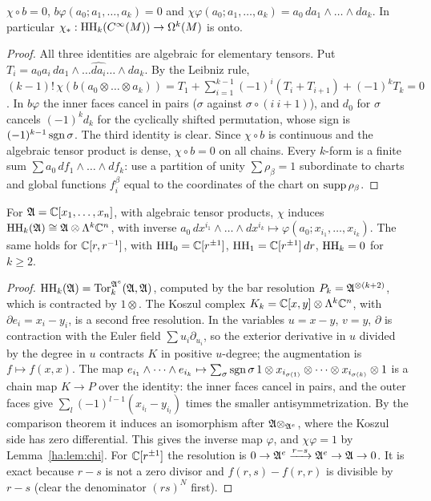 \begin{lemma}\label{ha:lem:chi}
\(\chi\circ b=0\), \(b\varphi(a_0;a_1,\dots,a_k)=0\) and
\(\chi\varphi(a_0;a_1,\dots,a_k)=a_0\,da_1\wedge\dots\wedge da_k\). In
particular \(\chi_*:\operatorname{HH}_k(C^\infty(M))\to\Omega^k(M)\) is onto.
\end{lemma}

\begin{proof}
All three identities are algebraic for elementary tensors. Put
\(T_i=a_0a_i\,da_1\wedge\dots\widehat{da_i}\dots\wedge da_k\). By the Leibniz
rule, \((k-1)!\,\chi(b(a_0\otimes\dots\otimes a_k))=T_1+\sum_{i=1}^{k-1}
(-1)^i(T_i+T_{i+1})+(-1)^kT_k=0\). In \(b\varphi\) the inner faces cancel in
pairs (\(\sigma\) against \(\sigma\circ(i\ i{+}1)\)), and \(d_0\) for
\(\sigma\) cancels \((-1)^kd_k\) for the cyclically shifted permutation,
whose sign is \((-1)^{k-1}\operatorname{sgn}\sigma\). The third identity is clear. Since
\(\chi\circ b\) is continuous and the algebraic tensor product is dense,
\(\chi\circ b=0\) on all chains. Every \(k\)-form is a finite sum
\(\sum a_0\,df_1\wedge\dots\wedge df_k\): use a partition of unity
\(\sum\rho_\beta=1\) subordinate to charts and global functions
\(f^\beta_i\) equal to the coordinates of the chart on
\(\operatorname{supp}\rho_\beta\).
\end{proof}

\begin{theorem}
\label{ha:thm:poly}
For \(\mathfrak A=\mathbb C[x_1,\dots,x_n]\), with algebraic tensor products, \(\chi\)
induces \(\operatorname{HH}_k(\mathfrak A)\cong\mathfrak A\otimes\Lambda^k\mathbb C^n\), with inverse
\(a_0\,dx^{i_1}\wedge\dots\wedge dx^{i_k}\mapsto\varphi(a_0;x_{i_1},
\dots,x_{i_k})\). The same holds for \(\mathbb C[r,r^{-1}]\), with
\(\operatorname{HH}_0=\mathbb C[r^{\pm1}]\), \(\operatorname{HH}_1=\mathbb C[r^{\pm1}]\,dr\), \(\operatorname{HH}_k=0\) for \(k\ge2\).
\end{theorem}

\begin{proof}
\(\operatorname{HH}_k(\mathfrak A)=\operatorname{Tor}^{\mathfrak A^e}_k(\mathfrak A,\mathfrak A)\), computed by the bar
resolution \(P_k=\mathfrak A^{\otimes(k+2)}\), which is contracted by \(1\otimes\).
The Koszul complex \(K_k=\mathbb C[x,y]\otimes\Lambda^k\mathbb C^n\), with
\(\partial e_i=x_i-y_i\), is a second free resolution. In the variables
\(u=x-y\), \(v=y\), \(\partial\) is contraction with the Euler field
\(\sum u_i\partial_{u_i}\), so the exterior derivative in \(u\) divided by
the degree in \(u\) contracts \(K\) in positive \(u\)-degree; the
augmentation is \(f\mapsto f(x,x)\). The map
\(e_{i_1}\wedge\dots\wedge e_{i_k}\mapsto\sum_\sigma\operatorname{sgn}\sigma\,1\otimes
x_{i_{\sigma(1)}}\otimes\dots\otimes x_{i_{\sigma(k)}}\otimes1\) is a
chain map \(K\to P\) over the identity: the inner faces cancel in pairs,
and the outer faces give \(\sum_l(-1)^{l-1}(x_{i_l}-y_{i_l})\) times the
smaller antisymmetrization. By the comparison theorem it induces an
isomorphism after \(\mathfrak A\otimes_{\mathfrak A^e}\), where the Koszul side has zero
differential. This gives the inverse map \(\varphi\), and
\(\chi\varphi=1\) by Lemma~\ref{ha:lem:chi}. For \(\mathbb C[r^{\pm1}]\) the
resolution is \(0\to\mathfrak A^e\xrightarrow{r-s}\mathfrak A^e\to\mathfrak A\to0\). It is exact
because \(r-s\) is not a zero divisor and \(f(r,s)-f(r,r)\) is divisible
by \(r-s\) (clear the denominator \((rs)^N\) first).
\end{proof}

